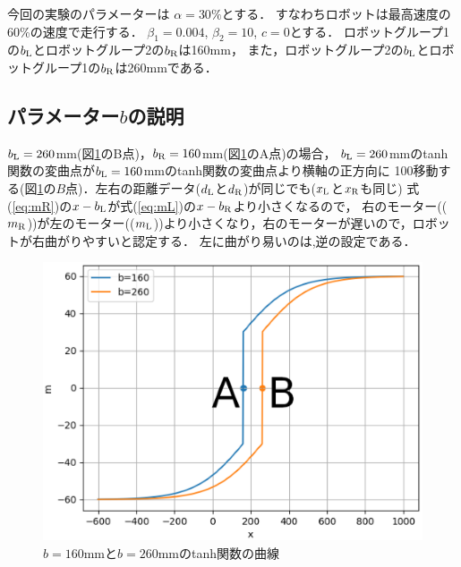 今回の実験のパラメーターは
$\alpha=30\%$とする．
すなわちロボットは最高速度の60\%の速度で走行する．
$\beta_1=0.004$,
$\beta_2=10$,
$c=0$とする．
ロボットグループ1の$b_{\rm L}$とロボットグループ2の$b_{\rm R}$は160mm，
また，ロボットグループ2の$b_{\rm L}$とロボットグループ1の$b_{\rm R}$は260mmである．

\subsection{パラメーター$b$の説明}
$b_{\rm L}=260$mm(図\ref{fitan}のB点)，$b_{\rm R}=160$mm(図\ref{fitan}のA点)の場合，
$b_{\rm L}=260$mmのtanh関数の変曲点が$b_{\rm L}=160$mmのtanh関数の変曲点より横軸の正方向に
100移動する(図\ref{fitan}の$B$点)．左右の距離データ($d_{\rm L}$と$d_{\rm R}$)が同じでも($x_{\rm L}$と$x_{\rm R}$も同じ)
式(\ref{eq:mR})の$x-b_{\rm L}$が式(\ref{eq:mL})の$x-b_{\rm R}$より小さくなるので，
右のモーター(($m_{\rm R}$))が左のモーター(($m_{\rm L}$))より小さくなり，右のモーターが遅いので，ロボットが右曲がりやすいと認定する．
左に曲がり易いのは,逆の設定である．
\begin{figure}[!ht]
    \centering
    \includegraphics[width=0.7\linewidth]{tanh.eps} 
    \caption{$b=160$mmと$b=260$mmのtanh関数の曲線}
    \label{fitan}
\end{figure}

